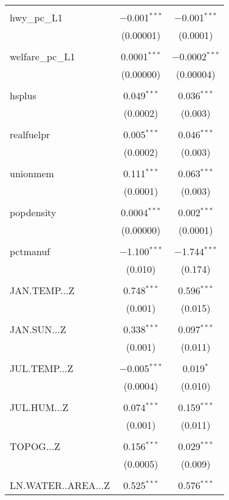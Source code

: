 \begin{table}[!htbp]
\begin{tabular}{@{\extracolsep{5pt}}lcc}
  & & \\ 
 hwy\_pc\_L1 & $-$0.001$^{***}$ & $-$0.001$^{***}$ \\ 
  & (0.00001) & (0.0001) \\ 
  & & \\ 
 welfare\_pc\_L1 & 0.0001$^{***}$ & $-$0.0002$^{***}$ \\ 
  & (0.00000) & (0.00004) \\ 
  & & \\ 
 hsplus & 0.049$^{***}$ & 0.036$^{***}$ \\ 
  & (0.0002) & (0.003) \\ 
  & & \\ 
 realfuelpr & 0.005$^{***}$ & 0.046$^{***}$ \\ 
  & (0.0002) & (0.003) \\ 
  & & \\ 
 unionmem & 0.111$^{***}$ & 0.063$^{***}$ \\ 
  & (0.0001) & (0.003) \\ 
  & & \\ 
 popdensity & 0.0004$^{***}$ & 0.002$^{***}$ \\ 
  & (0.00000) & (0.0001) \\ 
  & & \\ 
 pctmanuf & $-$1.100$^{***}$ & $-$1.744$^{***}$ \\ 
  & (0.010) & (0.174) \\ 
  & & \\ 
 JAN.TEMP...Z & 0.748$^{***}$ & 0.596$^{***}$ \\ 
  & (0.001) & (0.015) \\ 
  & & \\ 
 JAN.SUN...Z & 0.338$^{***}$ & 0.097$^{***}$ \\ 
  & (0.001) & (0.011) \\ 
  & & \\ 
 JUL.TEMP...Z & $-$0.005$^{***}$ & 0.019$^{*}$ \\ 
  & (0.0004) & (0.010) \\ 
  & & \\ 
 JUL.HUM...Z & 0.074$^{***}$ & 0.159$^{***}$ \\ 
  & (0.001) & (0.011) \\ 
  & & \\ 
 TOPOG...Z & 0.156$^{***}$ & 0.029$^{***}$ \\ 
  & (0.0005) & (0.009) \\ 
  & & \\ 
 LN.WATER..AREA...Z & 0.525$^{***}$ & 0.576$^{***}$ \\ 

\end{tabular}
\end{table}

